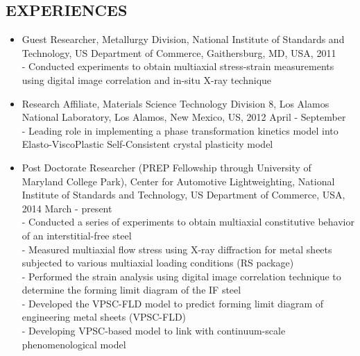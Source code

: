 \documentclass{res}
\begin{document}
\begin{resume}
  \section{EXPERIENCES}
  \begin{itemize}
  \item Guest Researcher, Metallurgy Division, National Institute of
    Standards and Technology, US Department of Commerce, Gaithersburg,
    MD, USA, 2011\\
    - Conducted experiments to obtain multiaxial stress-strain measurements
    using digital image correlation and in-situ X-ray technique
  \item Research Affiliate, Materials Science Technology Division 8, Los Alamos
    National Laboratory, Los Alamos, New Mexico, US, 2012 April - September \\
    - Leading role in implementing a phase transformation kinetics model into Elasto-ViscoPlastic Self-Consistent crystal plasticity model
  \item Post Doctorate Researcher (PREP Fellowship through University of Maryland College Park), Center for Automotive Lightweighting,
    National Institute of Standards and Technology, US Department of Commerce, USA, 2014 March - present\\
    - Conducted a series of experiments to obtain multiaxial constitutive behavior of an interstitial-free steel\\
    - Measured multiaxial flow stress using X-ray diffraction for metal sheets subjected to various multiaxial loading conditions (RS package)\\
    - Performed the strain analysis using digital image correlation technique to determine the forming limit diagram of the IF steel\\
    - Developed the VPSC-FLD model to predict forming limit diagram of engineering metal sheets (VPSC-FLD)\\
    - Developing VPSC-based model to link with continuum-scale phenomenological model
  \end{itemize}


\end{resume}
\end{document}
